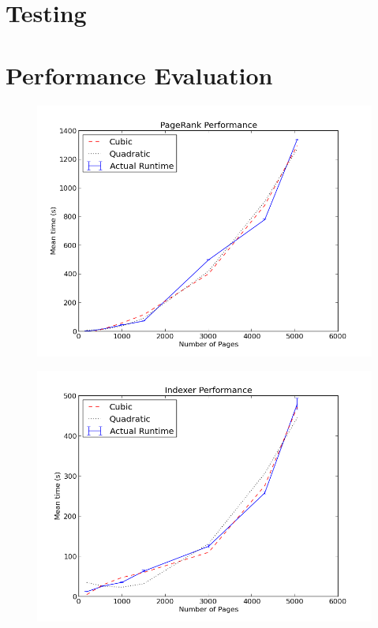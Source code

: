 \documentclass[12pt,notitlepage,twoside]{scrreprt}
\begin{document}
\section{Testing}

\section{Performance Evaluation}
\begin{figure}[h!]
  \centering
    \includegraphics[width=\linewidth]{figs/pr.png}
    \caption{}
    \label{pr}
\end{figure}

\begin{figure}[h!]
  \centering
    \includegraphics[width=\linewidth]{figs/ind.png}
    \caption{}
    \label{pr}
\end{figure}
\end{document}
